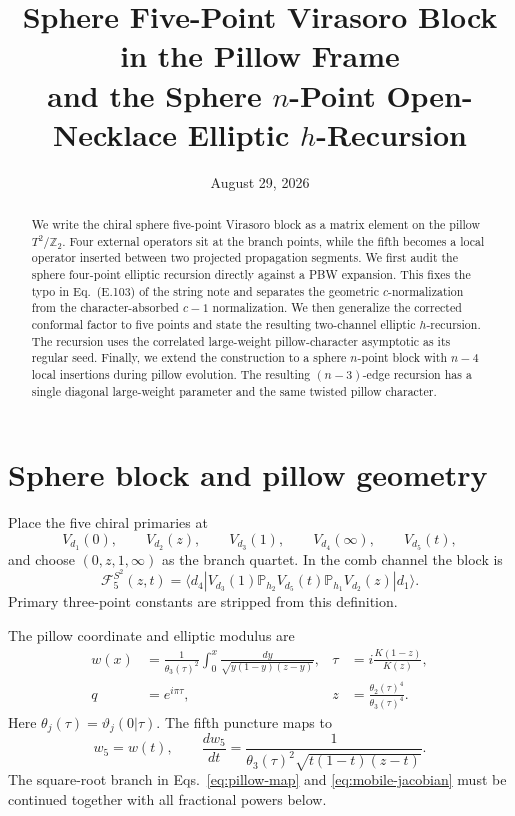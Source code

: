 \documentclass[11pt]{article}
\title{Sphere Five-Point Virasoro Block in the Pillow Frame\\
and the Sphere \texorpdfstring{$n$}{n}-Point Open-Necklace
Elliptic \texorpdfstring{$h$}{h}-Recursion}
\author{}
\date{August 29, 2026}
\newcommand{\cF}{\mathcal F}
\newcommand{\PP}{\mathbb P}
\begin{document}
\maketitle

\begin{abstract}
We write the chiral sphere five-point Virasoro block as a matrix element on
the pillow $T^2/\mathbb Z_2$.  Four external operators sit at the branch
points, while the fifth becomes a local operator inserted between two
projected propagation segments.  We first audit the sphere four-point
elliptic recursion directly against a PBW expansion.  This fixes the typo in
Eq.~(E.103) of the string note and separates the geometric
$c$-normalization from the character-absorbed $c-1$ normalization.  We then
generalize the corrected conformal factor to five points and state the
resulting two-channel elliptic $h$-recursion.  The recursion uses the
correlated large-weight pillow-character asymptotic as its regular seed.
Finally, we extend the construction to a sphere $n$-point block with
$n-4$ local insertions during pillow evolution.  The resulting
$(n-3)$-edge recursion has a single diagonal large-weight parameter and the
same twisted pillow character.
\end{abstract}

\section{Sphere block and pillow geometry}

Place the five chiral primaries at
\begin{equation}
 V_{d_1}(0),\qquad V_{d_2}(z),\qquad V_{d_3}(1),\qquad
 V_{d_4}(\infty),\qquad V_{d_5}(t),
 \label{eq:insertions}
\end{equation}
and choose $(0,z,1,\infty)$ as the branch quartet.  In the comb channel the
block is
\begin{equation}
 \cF^{S^2}_5(z,t)
 =
 \langle d_4|V_{d_3}(1)\PP_{h_2}V_{d_5}(t)
 \PP_{h_1}V_{d_2}(z)|d_1\rangle .
 \label{eq:sphere-block}
\end{equation}
Primary three-point constants are stripped from this definition.

The pillow coordinate and elliptic modulus are
\begin{align}
 w(x)
 &=\frac{1}{\theta_3(\tau)^2}
   \int_0^x\frac{dy}{\sqrt{y(1-y)(z-y)}},
 &
 \tau&=i\frac{K(1-z)}{K(z)},
 \label{eq:pillow-map}\\
 q&=e^{i\pi\tau},
 &
 z&=\frac{\theta_2(\tau)^4}{\theta_3(\tau)^4}.
 \label{eq:elliptic-data}
\end{align}
Here $\theta_j(\tau)=\vartheta_j(0|\tau)$.  The fifth puncture maps to
\begin{equation}
 w_5=w(t),\qquad
 \frac{dw_5}{dt}
 =\frac{1}{\theta_3(\tau)^2\sqrt{t(1-t)(z-t)}}.
 \label{eq:mobile-jacobian}
\end{equation}
The square-root branch in Eqs.~\eqref{eq:pillow-map} and
\eqref{eq:mobile-jacobian} must be continued together with all fractional
powers below.
\end{document}
